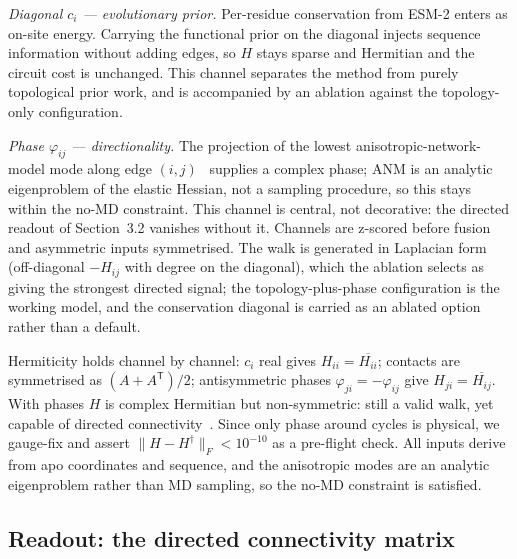 \documentclass[10pt,a4paper]{article}
\begin{document}
\emph{Diagonal $c_i$ --- evolutionary prior.} Per-residue conservation from ESM-2
enters as on-site energy. Carrying the functional prior on the diagonal injects sequence information
without adding edges, so $H$ stays sparse and Hermitian and the circuit cost is unchanged. This
channel separates the method from purely topological prior work, and is accompanied by an ablation
against the topology-only configuration.

\emph{Phase $\varphi_{ij}$ --- directionality.} The projection of the lowest
anisotropic-network-model mode along edge $(i,j)$~\cite{atilgan2001} supplies a complex phase; ANM is
an analytic eigenproblem of the elastic Hessian, not a sampling procedure, so this stays within the
no-MD constraint. This channel is central, not decorative: the directed readout of Section~3.2
vanishes without it. Channels are z-scored before fusion and asymmetric inputs symmetrised. The walk
is generated in Laplacian form (off-diagonal $-H_{ij}$ with degree on the diagonal), which the
ablation selects as giving the strongest directed signal; the topology-plus-phase configuration is
the working model, and the conservation diagonal is carried as an ablated option rather than a
default.

Hermiticity holds channel by channel: $c_i$ real gives $H_{ii} = \overline{H_{ii}}$; contacts are
symmetrised as $(A + A^{\mathsf T})/2$; antisymmetric phases $\varphi_{ji} = -\varphi_{ij}$ give
$H_{ji} = \overline{H_{ij}}$. With phases $H$ is complex Hermitian but non-symmetric: still a valid
walk, yet capable of directed connectivity~\cite{lu2016}. Since only phase around cycles is
physical, we gauge-fix and assert $\lVert H - H^{\dagger}\rVert_F < 10^{-10}$ as a pre-flight check.
All inputs derive from apo coordinates and sequence, and the anisotropic modes are an analytic
eigenproblem rather than MD sampling, so the no-MD constraint is satisfied.

\subsection{Readout: the directed connectivity matrix}
\end{document}
